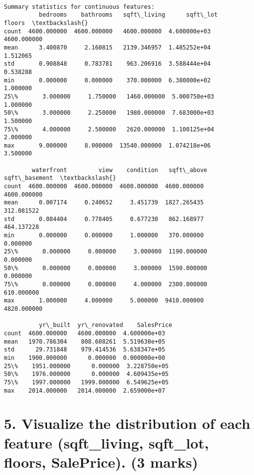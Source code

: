 \documentclass[11pt]{article}
\begin{document}
    \begin{Verbatim}[commandchars=\\\{\}]

Summary statistics for continuous features:
          bedrooms    bathrooms   sqft\_living      sqft\_lot       floors  \textbackslash{}
count  4600.000000  4600.000000   4600.000000  4.600000e+03  4600.000000
mean      3.400870     2.160815   2139.346957  1.485252e+04     1.512065
std       0.908848     0.783781    963.206916  3.588444e+04     0.538288
min       0.000000     0.000000    370.000000  6.380000e+02     1.000000
25\%       3.000000     1.750000   1460.000000  5.000750e+03     1.000000
50\%       3.000000     2.250000   1980.000000  7.683000e+03     1.500000
75\%       4.000000     2.500000   2620.000000  1.100125e+04     2.000000
max       9.000000     8.000000  13540.000000  1.074218e+06     3.500000

        waterfront         view    condition   sqft\_above  sqft\_basement  \textbackslash{}
count  4600.000000  4600.000000  4600.000000  4600.000000    4600.000000
mean      0.007174     0.240652     3.451739  1827.265435     312.081522
std       0.084404     0.778405     0.677230   862.168977     464.137228
min       0.000000     0.000000     1.000000   370.000000       0.000000
25\%       0.000000     0.000000     3.000000  1190.000000       0.000000
50\%       0.000000     0.000000     3.000000  1590.000000       0.000000
75\%       0.000000     0.000000     4.000000  2300.000000     610.000000
max       1.000000     4.000000     5.000000  9410.000000    4820.000000

          yr\_built  yr\_renovated    SalesPrice
count  4600.000000   4600.000000  4.600000e+03
mean   1970.786304    808.608261  5.519630e+05
std      29.731848    979.414536  5.638347e+05
min    1900.000000      0.000000  0.000000e+00
25\%    1951.000000      0.000000  3.228750e+05
50\%    1976.000000      0.000000  4.609435e+05
75\%    1997.000000   1999.000000  6.549625e+05
max    2014.000000   2014.000000  2.659000e+07
    \end{Verbatim}

    \section{5. Visualize the distribution of each feature (sqft\_living,
sqft\_lot, floors, SalePrice). (3
marks)}\label{visualize-the-distribution-of-each-feature-sqft_living-sqft_lot-floors-saleprice.-3-marks}
\end{document}
